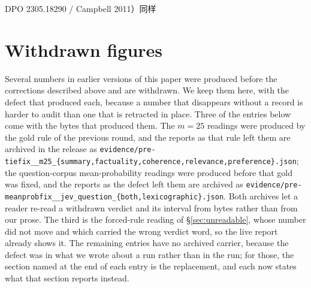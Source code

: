\documentclass{article}
\newcommand{\ids}[1]{\texttt{\small #1}} %
\begin{document}
DPO 2305.18290 / Campbell 2011）同样 %

\appendix
\section{Withdrawn figures}
\label{app:withdrawn}

Several numbers in earlier versions of this paper were produced before the
corrections described above and are withdrawn. We keep them here, with the
defect that produced each, because a number that disappears without a record is
harder to audit than one that is retracted in place. Three of the entries below come with the bytes that produced them. The $m=25$ readings were
produced by the gold rule of the previous round, and the reports as that rule left them are archived in the
release as \ids{evidence/pre-tiefix\_\_m25\_\{summary,factuality,coherence,relevance,preference\}.json}; the
question-corpus mean-probability readings were produced before that gold was fixed, and the reports as the
defect left them are archived as \ids{evidence/\allowbreak pre-meanprobfix\_\allowbreak\_\allowbreak jev\_\allowbreak question\_\allowbreak \{both,\allowbreak lexicographic\}.json}.
Both archives let a reader re-read a withdrawn verdict and its interval from bytes rather than from our prose.
The third is the forced-rule reading of \S\ref{sec:unreadable}, whose number did not move and which carried
the wrong verdict word, so the live report already shows it. The remaining entries have no archived carrier,
because the defect was in what we wrote about a run rather than in the run; for those, the section named at
the end of each entry is the replacement, and each now states what that section reports instead.
\end{document}
